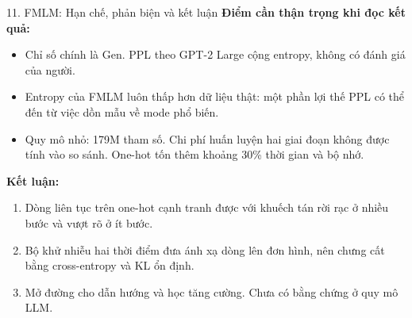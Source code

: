 \begin{frame}{11. FMLM: Hạn chế, phản biện và kết luận}
    \small
    \textbf{Điểm cần thận trọng khi đọc kết quả:}
    \begin{itemize}
        \item Chỉ số chính là Gen. PPL theo GPT-2 Large cộng entropy, không có đánh giá của người.
        \item Entropy của FMLM luôn thấp hơn dữ liệu thật: một phần lợi thế PPL có thể đến từ việc dồn mẫu về mode phổ biến.
        \item Quy mô nhỏ: 179M tham số. Chi phí huấn luyện hai giai đoạn không được tính vào so sánh. One-hot tốn thêm khoảng 30\% thời gian và bộ nhớ.
    \end{itemize}
    \vspace{0.1cm}
    \textbf{Kết luận:}
    \begin{enumerate}
        \item Dòng liên tục trên one-hot cạnh tranh được với khuếch tán rời rạc ở nhiều bước và vượt rõ ở ít bước.
        \item Bộ khử nhiễu hai thời điểm đưa ánh xạ dòng lên đơn hình, nên chưng cất bằng cross-entropy và KL ổn định.
        \item Mở đường cho dẫn hướng và học tăng cường. Chưa có bằng chứng ở quy mô LLM.
    \end{enumerate}
\end{frame}
